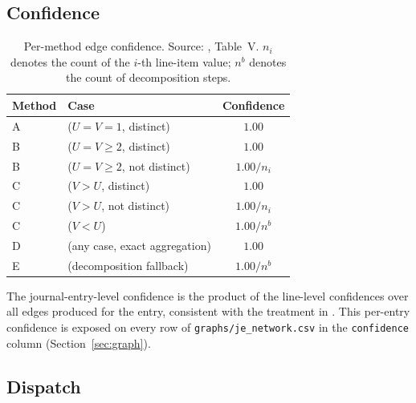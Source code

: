 \subsection{Confidence}
\label{sec:network:confidence}

\begin{table}[H]
  \centering
  \caption{Per-method edge confidence.  Source: \citet{ivertowski2024apn},
    Table~V.  $n_i$ denotes the count of the $i$-th line-item value;
    $n^b$ denotes the count of decomposition steps.}
  \label{tab:confidence}
  \begin{tabular}{llc}
    \toprule
    \textbf{Method} & \textbf{Case} & \textbf{Confidence}\\
    \midrule
    A & ($U = V = 1$, distinct)            & $1.00$\\
    B & ($U = V \geq 2$, distinct)         & $1.00$\\
    B & ($U = V \geq 2$, not distinct)     & $1.00 / n_i$\\
    C & ($V > U$, distinct)                & $1.00$\\
    C & ($V > U$, not distinct)            & $1.00 / n_i$\\
    C & ($V < U$)                          & $1.00 / n^b$\\
    D & (any case, exact aggregation)      & $1.00$\\
    E & (decomposition fallback)           & $1.00 / n^b$\\
    \bottomrule
  \end{tabular}
\end{table}

The journal-entry-level confidence is the product of the line-level
confidences over all edges produced for the entry, consistent with
the treatment in \citet{ivertowski2024apn}.  This per-entry
confidence is exposed on every row of \texttt{graphs/je\_network.csv}
in the \texttt{confidence} column (Section~\ref{sec:graph}).

\subsection{Dispatch}
\label{sec:network:dispatch}

